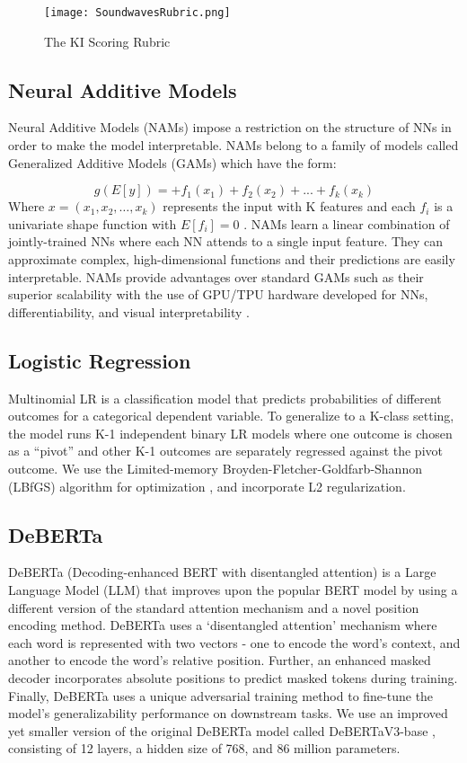 \begin{figure}
\centering
  \texttt{[image: SoundwavesRubric.png]}
  \caption{The KI Scoring Rubric}
  \label{soudwavesrubric}
\end{figure}

\subsection{Neural Additive Models}
Neural Additive Models (NAMs) impose a restriction on the structure of NNs in order to make the model interpretable. NAMs belong to a family of models called Generalized Additive Models (GAMs) which have the form: 

\[g(E[y]) =  + f_1(x_1) +f_2(x_2) + ... + f_k(x_k)\]
Where \(x = (x_1, x_2, \dots, x_k)\) represents the input with K features and each \(f_i\) is a univariate shape function with \(E[f_i] = 0\) \cite{agarwal2020neural}. NAMs learn a linear combination of jointly-trained NNs where each NN attends to a single input feature. They can approximate complex, high-dimensional functions and their predictions are easily interpretable. NAMs provide advantages over standard GAMs such as their superior scalability with the use of GPU/TPU hardware developed for NNs, differentiability, and visual interpretability \cite{agarwal2020neural}. 

\subsection{Logistic Regression}
Multinomial LR is a classification model that predicts probabilities of different outcomes for a categorical dependent variable. To generalize to a K-class setting, the model runs K-1 independent binary LR models where one outcome is chosen as a “pivot” and other K-1 outcomes are separately regressed against the pivot outcome. We use the Limited-memory Broyden-Fletcher-Goldfarb-Shannon (LBfGS) algorithm for optimization \cite{fletcher2000practical}, and incorporate L2 regularization. 

\subsection{DeBERTa}
DeBERTa (Decoding-enhanced BERT with disentangled attention) is a Large Language Model (LLM) that improves upon the popular BERT \cite{devlin2018bert} model by using a different version of the standard attention mechanism \cite{vaswani2017attention} and a novel position encoding method. DeBERTa uses a ‘disentangled attention’ mechanism where each word is represented with two vectors - one to encode the word’s context, and another to encode the word’s relative position. Further, an enhanced masked decoder incorporates absolute positions to predict masked tokens during training. Finally, DeBERTa uses a unique adversarial training method to fine-tune the model’s generalizability performance on downstream tasks. We use an improved yet smaller version of the original DeBERTa model called DeBERTaV3-base \cite{he2021debertav3}, consisting of 12 layers, a hidden size of 768, and 86 million parameters.

